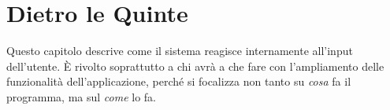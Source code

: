 \section{Dietro le Quinte}
Questo capitolo descrive come il sistema reagisce internamente all'input dell'utente. È rivolto soprattutto a chi avrà a che fare con l'ampliamento delle funzionalità dell'applicazione, perché si focalizza non tanto su \textit{cosa} fa il programma, ma sul \textit{come} lo fa.